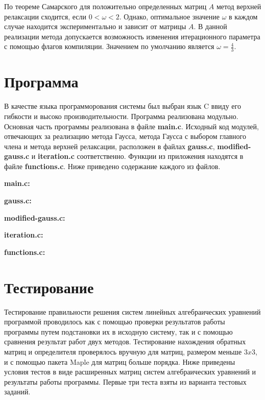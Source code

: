 \documentclass[12pt, a4paper]{report}
\begin{document}
{\normalsize{По теореме Самарского \cite{computational_science_iter} для положительно определенных матриц $A$
            метод верхней релаксации сходится, если $0 < \omega < 2$. Однако, оптимальное значение $\omega$ в каждом случае
            находится экспериментально и зависит от матрицы $A$. В данной реализации метода допускается возможность
            изменения итерационного параметра с помощью флагов компиляции. Значением по умолчанию является $\omega = \frac{4}{3}$.}
\newpage



\chapter{Программа}
\normalsize{В качестве языка программорования системы был выбран язык C ввиду его гибкости и высоко производительности. 
            Программа реализована модульно. Основная часть программы реализована в файле \textbf{main.c}.
            Исходный код модулей, отвечающих за реализацию метода Гаусса, метода Гаусса с выбором главного члена и
            метода верхней релаксации, расположен в файлах \textbf{gauss.c}, \textbf{modified-gauss.c} и \textbf{iteration.c} соответственно.
            Функции из приложения  находятся в файле \textbf{functions.c}.
            Ниже приведено содержание каждого из файлов.}

\vspace{1cm}
\normalsize{\bfseries main.c:}


\vspace{1cm}
\normalsize{\bfseries gauss.c:}


\vspace{1cm}
\normalsize{\bfseries modified-gauss.c:}


\vspace{1cm}
\normalsize{\bfseries iteration.c:}


\vspace{1cm}
\normalsize{\bfseries functions.c:}


\newpage



\chapter{Тестирование}
\normalsize{Тестирование правильности решения систем линейных алгебраических уравнений программой
            проводилось как с помощью проверки результатов работы программы путем подстановки их 
            в исходную систему, так и с помощью сравнения результат работ двух методов. Тестирование
            нахождения обратных матриц и определителя проверялось вручную для матриц, размером меньше
            $3 x 3$, и с помощью пакета Maple для матриц больше порядка.}
\normalsize{Ниже приведены условия тестов в виде расширенных матриц систем алгебраических уравнений и результаты работы программы.
            Первые три теста взяты из варианта  тестовых заданий.}

}
\end{document}
